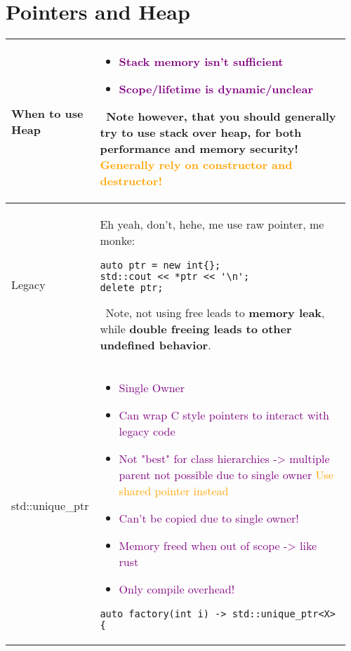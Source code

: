 \documentclass[main.tex,fontsize=8pt,paper=a4,paper=portrait,DIV=calc,]{scrartcl}
\begin{document}
\begin{table}[ht!]
\section{Pointers and Heap}
\begin{tabular}{|m{0.2\linewidth}|m{0.755\linewidth}|}
\hline
When to use Heap & 
\vspace{2mm}
\begin{itemize}
\item \textcolor{purple}{Stack memory isn't sufficient}
\item \textcolor{purple}{Scope/lifetime is dynamic/unclear}
\end{itemize} 
\, \newline
Note however, that you should generally try to use stack over heap, for both \textbf{performance and memory security!}\newline
\textcolor{orange}{Generally rely on constructor and destructor!}\\
\hline
Legacy & 
Eh yeah, don't, hehe, me use raw pointer, me monke:\newline
\begin{lstlisting}
auto ptr = new int{};
std::cout << *ptr << '\n';
delete ptr;
\end{lstlisting} 
\, \newline
Note, not using free leads to \textbf{memory leak}, while \textbf{double freeing leads to other undefined behavior}.\\
\hline
std::unique\_ptr & 
\vspace{2mm}
\begin{itemize}
\item \textcolor{purple}{Single Owner}
\item \textcolor{purple}{Can wrap C style pointers to interact with legacy code}
\item \textcolor{purple}{Not "best" for class hierarchies -> multiple parent not possible due to single owner}\newline
  \textcolor{orange}{Use shared pointer instead}
\item \textcolor{purple}{Can't be copied due to single owner!}
\item \textcolor{purple}{Memory freed when out of scope -> like rust}
\item \textcolor{purple}{Only compile overhead!}
\end{itemize} 
\begin{lstlisting}
auto factory(int i) -> std::unique_ptr<X> {

\end{lstlisting}
\end{tabular}
\end{table}
\end{document}
